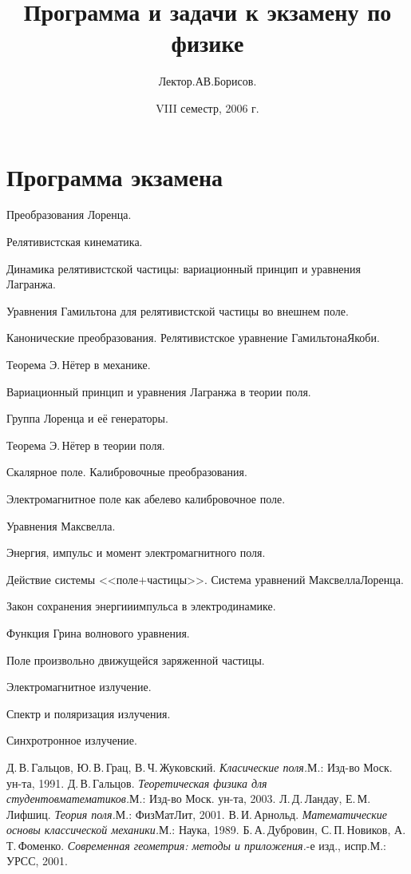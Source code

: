 \documentclass[a4paper,draft]{article}
\title{Программа и задачи к экзамену по физике}
\author{Лектор\т \iof.АВ.Борисов.}
\date{VIII семестр, 2006 г.}
\def\iof.#1#2.#3.{#1.\,#2.\,#3}
\begin{document}
\maketitle

\section*{Программа экзамена}

\begin{nums}{-2}
\item Преобразования Лоренца.
\item Релятивистская кинематика.
\item Динамика релятивистской частицы: вариационный принцип и уравнения Лагранжа.
\item Уравнения Гамильтона для релятивистской частицы во внешнем поле.
\item Канонические преобразования. Релятивистское уравнение Гамильтона\ч Якоби.
\item Теорема Э.\,Нётер в механике.
\item Вариационный принцип и уравнения Лагранжа в теории поля.
\item Группа Лоренца и её генераторы.
\item Теорема Э.\,Нётер в теории поля.
\item Скалярное поле. Калибровочные преобразования.
\item Электромагнитное поле как абелево калибровочное поле.
\item Уравнения Максвелла.
\item Энергия, импульс и момент электромагнитного поля.
\item Действие системы <<поле$+$частицы>>. Система уравнений Максвелла\ч Лоренца.
\item Закон сохранения энергии\д импульса в электродинамике.
\item Функция Грина волнового уравнения.
\item Поле произвольно движущейся заряженной частицы.
\item Электромагнитное излучение.
\item Спектр и поляризация излучения.
\item Синхротронное излучение.
\end{nums}

\begin{thebibliography}{5}
\setlength\itemsep{-2pt}
    \iof.ДВ.Гальцов., \iof.ЮВ.Грац., \iof.ВЧ.Жуковский.. \emph{Класические поля.}\т М.: Изд-во Моск. ун-та, 1991.
    \iof.ДВ.Гальцов.. \emph{Теоретическая физика для студентов\д математиков.}\т М.: Изд-во Моск. ун-та, 2003.
    \iof.ЛД.Ландау., \iof.ЕМ.Лифшиц.. \emph{Теория поля.}\т М.: ФизМатЛит, 2001.
    \iof.ВИ.Арнольд.. \emph{Математические основы классической механики.}\т М.: Наука, 1989.
    \iof.БА.Дубровин., \iof.СП.Новиков., \iof.АТ.Фоменко.. \emph{Современная геометрия: методы и приложения.}-е изд., испр.\т М.: УРСС, 2001.
\end{thebibliography}
\end{document}
